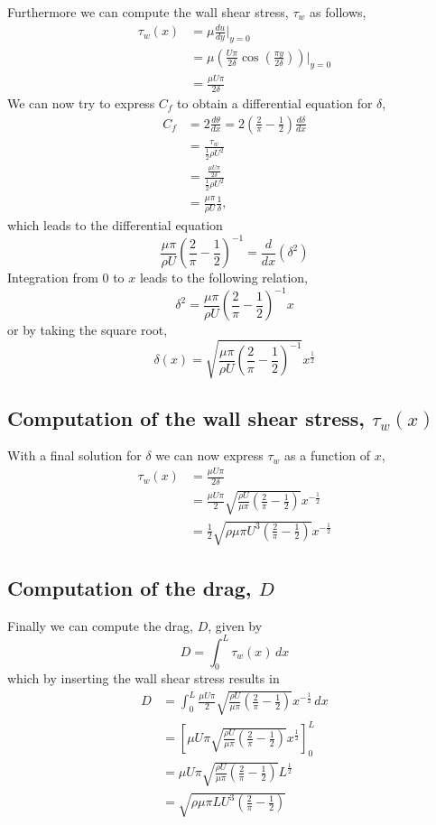 \documentclass[12pt]{amsart}
\begin{document}
Furthermore we can compute the wall shear stress, $\tau_w$ as follows,
\begin{align*}
  \tau_w(x) &= \mu \frac{d u}{d y}\bigg|_{y=0}\\
  &=\mu \left( \frac{U\pi}{2 \delta} \cos \left(\frac{\pi y}{2\delta}\right) \right)\bigg|_{y=0}\\
  &= \frac{\mu U \pi}{2 \delta}
\end{align*}
We can now try to express $C_f$ to obtain a differential equation for $\delta$,
\begin{align*}
  C_f &= 2\frac{d\theta}{d x} = 2 \left(\frac{2}{\pi} - \frac{1}{2} \right) \frac{d \delta}{d x} \\ 
  &= \frac{\tau_w}{\frac{1}{2}\rho U^2} \\
  &= \frac{\frac{\mu U \pi}{2 \delta}}{\frac{1}{2}\rho U^2} \\
  &= \frac{\mu \pi}{\rho U} \frac{1}{\delta},
\end{align*}
which leads to the differential equation
\[
  \frac{\mu \pi}{\rho U} \left(\frac{2}{\pi} - \frac{1}{2} \right)^{-1} = \frac{d}{dx}(\delta^2)
\]
Integration from 0 to $x$ leads to the following relation, 
\[
  \delta^2 =  \frac{\mu \pi}{\rho U} \left(\frac{2}{\pi} - \frac{1}{2} \right)^{-1}x 
\]
or by taking the square root,
\[
  \delta(x)  = \sqrt{\frac{\mu \pi}{\rho U} \left(\frac{2}{\pi} - \frac{1}{2} \right)^{-1}} x^{\frac{1}{2}}
\]

\subsection*{Computation of the wall shear stress, $\tau_w(x)$}
With a final solution for $\delta$ we can now express $\tau_w$ as a function of $x$, 
\begin{align*}
  \tau_w(x) &= \frac{\mu U \pi}{2 \delta} \\
  &=   \frac{\mu U \pi}{2} \sqrt{\frac{\rho U}{\mu \pi} \left(\frac{2}{\pi} - \frac{1}{2} \right)} x^{-\frac{1}{2}}\\
  &=   \frac{1}{2} \sqrt{\rho \mu \pi U^3 \left(\frac{2}{\pi} - \frac{1}{2} \right)} x^{-\frac{1}{2}}
\end{align*}
\subsection*{Computation of the drag, $D$}
Finally we can compute the drag, $D$, given by
\[
  D = \int_0^L \tau_w(x)\, dx
\]
which by inserting the wall shear stress results in
\begin{align*}
  D &= \int_0^L  \frac{\mu U \pi}{2} \sqrt{\frac{\rho U}{\mu \pi} \left(\frac{2}{\pi} - \frac{1}{2} \right)} x^{-\frac{1}{2}}\, dx\\
  &=  \left[ \mu U \pi \sqrt{\frac{\rho U}{\mu \pi} \left(\frac{2}{\pi} - \frac{1}{2} \right)} x^{\frac{1}{2}}\right]^L_0\\
  &=  \mu U \pi \sqrt{\frac{\rho U}{\mu \pi} \left(\frac{2}{\pi} - \frac{1}{2} \right)} L^{\frac{1}{2}}\\
  &=  \sqrt{\rho \mu \pi L U^3 \left(\frac{2}{\pi} - \frac{1}{2} \right)} 
\end{align*}
\end{document}
